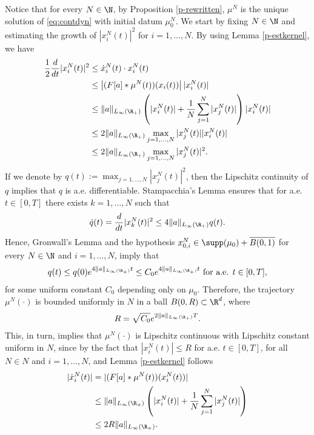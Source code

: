 Notice that for every $N \in \N$, by Proposition \ref{p-rewritten}, $\mu^N$ is the unique solution of \eqref{eq:contdyn} with initial datum $\mu^N_0$. We start by fixing $N \in \N$ and estimating the growth of $|x_i^N(t)|^2$ for $i = 1, \ldots, N$. By using Lemma \ref{p-estkernel}, we have
\begin{align*}
\frac{1}{2}\frac{d}{dt} |x_i^N(t)|^2 & \leq \dot{x}_i^N(t) \cdot x_i^N(t) \\
& \leq \left|(F[a]*\mu^N(t))(x_i(t))\right| |x_i^N(t)| \\
& \leq \|a\|_{L_{\infty}(\R_+)}\left( |x_i^N(t)| + \frac{1}{N} \sum^N_{j = 1}|x_j^N(t)| \right) |x_i^N(t)| \\
& \leq 2 \|a\|_{L_{\infty}(\R_+)}\max_{j = 1, \ldots, N} |x_j^N(t)| |x_i^N(t)| \\
& \leq 2 \|a\|_{L_{\infty}(\R_+)}\max_{j = 1, \ldots, N} |x_j^N(t)|^2.
\end{align*}
If we denote by $q(t) := \max_{j = 1, \ldots, N} |x_j^N(t)|^2$, then the Lipschitz continuity of $q$ implies that $q$ is a.e. differentiable. Stampacchia's Lemma \cite[Chapter 2, Lemma A.4]{Kin-Sta} ensures that for a.e. $t \in [0,T]$ there exists $k = 1, \ldots, N$ such that
\begin{align*}
\dot{q}(t) = \frac{d}{dt} |x_k^N(t)|^2 \leq 4 \|a\|_{L_{\infty}(\R_+)} q(t).
\end{align*}
Hence, Gronwall's Lemma and the hypothesis $x^{N}_{0,i} \in \supp(\mu_0) + \overline{B(0,1)}$ for every $N \in \N$ and $i = 1, \ldots, N$, imply that
\begin{align*}
q(t) \leq q(0) e^{4 \|a\|_{L_{\infty}(\R_+)} t} \leq C_0 e^{4 \|a\|_{L_{\infty}(\R_+)} t} \text{ for a.e. } t \in [0,T],
\end{align*}
for some uniform constant $C_0$ depending only on $\mu_0$. Therefore, the trajectory $\mu^N(\cdot)$ is bounded uniformly in $N$ in a ball $B(0,R) \subset \R^d$, where
\begin{align}\label{Rest}
R =  \sqrt{C_0} e^{2 \|a\|_{L_{\infty}(\R_+)} T}.
\end{align}
This, in turn, implies that $\mu^N(\cdot)$ is Lipschitz continuous with Lipschitz constant uniform in $N$, since by the fact that $|x^N_i(t)| \leq R$ for a.e. $t \in [0,T]$, for all $N \in N$ and $i = 1, \ldots, N$, and Lemma \ref{p-estkernel} follows
\begin{align*}
|\dot{x}^N_i(t)| &= |(F[a]*\mu^N(t))(x^N_i(t))| \\
&\leq \|a\|_{L_{\infty}(\R_+)} \left( |x^N_i(t)| + \frac{1}{N}\sum^N_{j = 1}|x^N_j(t)|\right) \\
&\leq 2R\|a\|_{L_{\infty}(\R_+)}.
\end{align*}
